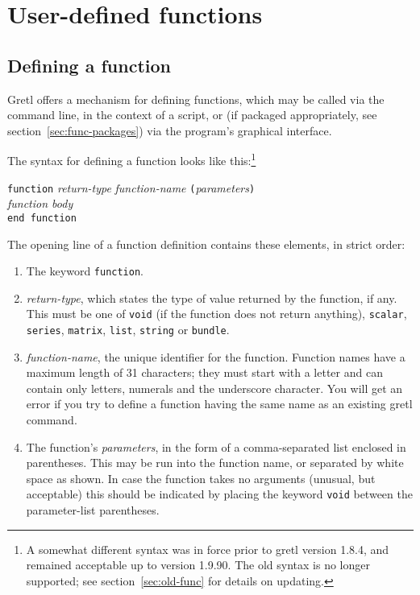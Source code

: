 \chapter{User-defined functions}
\label{chap:functions}

\section{Defining a function}
\label{func-define}

Gretl offers a mechanism for defining functions, which may be
called via the command line, in the context of a script, or (if
packaged appropriately, see section~\ref{sec:func-packages}) via the
program's graphical interface.

The syntax for defining a function looks like this:\footnote{A
  somewhat different syntax was in force prior to gretl version 1.8.4,
  and remained acceptable up to version 1.9.90. The old syntax is no
  longer supported; see section~\ref{sec:old-func} for details on
  updating.}

\begin{raggedright}
\texttt{function} \textsl{return-type} \textsl{function-name}
\texttt{(}\textsl{parameters}\texttt{)} \\
\qquad  \textsl{function body} \\
\texttt{end function}
\end{raggedright}

The opening line of a function definition contains these elements, in
strict order:

\begin{enumerate}
\item The keyword \texttt{function}.
\item \textsl{return-type}, which states the type of value returned by
  the function, if any.  This must be one of \texttt{void} (if the
  function does not return anything), \texttt{scalar},
  \texttt{series}, \texttt{matrix}, \texttt{list}, \texttt{string} or
  \texttt{bundle}.
\item \textsl{function-name}, the unique identifier for the function.
  Function names have a maximum length of 31 characters; they must
  start with a letter and can contain only letters, numerals and the
  underscore character.  You will get an error if you try to define a
  function having the same name as an existing gretl command.
\item The function's \textsl{parameters}, in the form of a
  comma-separated list enclosed in parentheses.  This may be run into
  the function name, or separated by white space as shown.  In case
  the function takes no arguments (unusual, but acceptable) this
  should be indicated by placing the keyword \texttt{void} between
  the parameter-list parentheses.
\end{enumerate}

